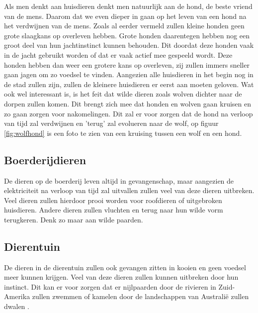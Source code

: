 Als men denkt aan huisdieren denkt men natuurlijk aan de hond, de beste vriend van de mens. Daarom dat we even dieper in gaan op het leven van een hond na het verdwijnen van de mens. Zoals al eerder vermeld zullen kleine honden geen grote slaagkans op overleven hebben. Grote honden daarentegen hebben nog een groot deel van hun jachtinstinct kunnen behouden. Dit doordat deze honden vaak in de jacht gebruikt worden of dat er vaak actief mee gespeeld wordt. Deze honden hebben dan weer een grotere kans op overleven, zij zullen immers sneller gaan jagen om zo voedsel te vinden. Aangezien alle huisdieren in het begin nog in de stad zullen zijn, zullen de kleinere huisdieren er eerst aan moeten geloven. Wat ook wel interessant is, is het feit dat wilde dieren zoals wolven dichter naar de dorpen zullen komen. Dit brengt zich mee dat honden en wolven gaan kruisen en zo gaan zorgen voor nakomelingen. Dit zal er voor zorgen dat de hond na verloop van tijd zal verdwijnen en 'terug' zal evolueren naar de wolf, op figuur \ref{fig:wolfhond} is een foto te zien van een kruising tussen een wolf en een hond.
\subsection{Boerderijdieren}
De dieren op de boerderij leven altijd in gevangenschap, maar aangezien de elektriciteit na verloop van tijd zal uitvallen zullen veel van deze dieren uitbreken. Veel dieren zullen hierdoor prooi worden voor roofdieren of uitgebroken huisdieren. Andere dieren zullen vluchten en terug naar hun wilde vorm terugkeren. Denk zo maar aan wilde paarden.
\subsection{Dierentuin}
De dieren in de dierentuin zullen ook gevangen zitten in kooien en geen voedsel meer kunnen krijgen. Veel van deze dieren zullen kunnen uitbreken door hun instinct. Dit kan er voor zorgen dat er nijlpaarden door de rivieren in Zuid-Amerika zullen zwemmen of kamelen door de landschappen van Australi\"{e} zullen dwalen \cite{ASAPScience}.
